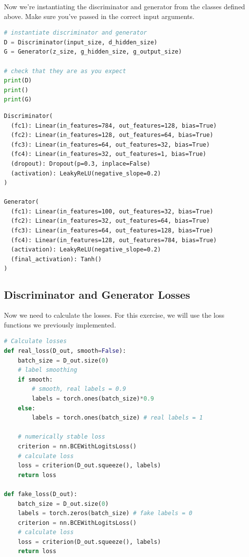 Now we're instantiating the discriminator and generator from the classes
defined above. Make sure you've passed in the correct input arguments.

\begin{lstlisting}[language=Python]
# instantiate discriminator and generator
D = Discriminator(input_size, d_hidden_size)
G = Generator(z_size, g_hidden_size, g_output_size)

# check that they are as you expect
print(D)
print()
print(G)
\end{lstlisting}

\begin{lstlisting}
Discriminator(
  (fc1): Linear(in_features=784, out_features=128, bias=True)
  (fc2): Linear(in_features=128, out_features=64, bias=True)
  (fc3): Linear(in_features=64, out_features=32, bias=True)
  (fc4): Linear(in_features=32, out_features=1, bias=True)
  (dropout): Dropout(p=0.3, inplace=False)
  (activation): LeakyReLU(negative_slope=0.2)
)

Generator(
  (fc1): Linear(in_features=100, out_features=32, bias=True)
  (fc2): Linear(in_features=32, out_features=64, bias=True)
  (fc3): Linear(in_features=64, out_features=128, bias=True)
  (fc4): Linear(in_features=128, out_features=784, bias=True)
  (activation): LeakyReLU(negative_slope=0.2)
  (final_activation): Tanh()
)
\end{lstlisting}

\subsection{Discriminator and Generator
Losses}

Now we need to calculate the losses. For this exercise, we will use the
loss functions we previously implemented.

\begin{lstlisting}[language=Python]
# Calculate losses
def real_loss(D_out, smooth=False):
    batch_size = D_out.size(0)
    # label smoothing
    if smooth:
        # smooth, real labels = 0.9
        labels = torch.ones(batch_size)*0.9
    else:
        labels = torch.ones(batch_size) # real labels = 1
        
    # numerically stable loss
    criterion = nn.BCEWithLogitsLoss()
    # calculate loss
    loss = criterion(D_out.squeeze(), labels)
    return loss

def fake_loss(D_out):
    batch_size = D_out.size(0)
    labels = torch.zeros(batch_size) # fake labels = 0
    criterion = nn.BCEWithLogitsLoss()
    # calculate loss
    loss = criterion(D_out.squeeze(), labels)
    return loss
\end{lstlisting}

